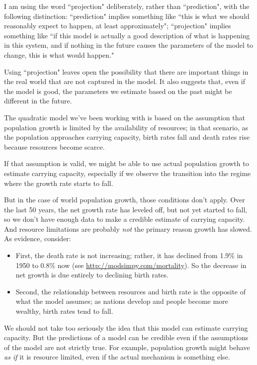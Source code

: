 \documentclass[12pt]{book}
\theoremstyle{exercise}
\begin{document}
I am using the word ``projection" deliberately, rather than ``prediction", with the following distinction: ``prediction" implies something like ``this is what we should reasonably expect to happen, at least approximately"; ``projection" implies something like ``if this model is actually a good description of what is happening in this system, and if nothing in the future causes the parameters of the model to change, this is what would happen."

Using ``projection" leaves open the possibility that there are important things in the real world that are not captured in the model.  It also suggests that, even if the model is good, the parameters we estimate based on the past might be different in the future.

The quadratic model we've been working with is based on the assumption that population growth is limited by the availability of resources; in that scenario, as the population approaches carrying capacity, birth rates fall and death rates rise because resources become scarce.

If that assumption is valid, we might be able to use actual population growth to estimate carrying capacity, especially if we observe the transition into the regime where the growth rate starts to fall.

But in the case of world population growth, those conditions don't apply.  Over the last 50 years, the net growth rate has leveled off, but not yet started to fall, so we don't have enough data to make a credible estimate of carrying capacity.  And resource limitations are probably {\em not} the primary reason growth has slowed.  As evidence, consider:

\begin{itemize}

\item First, the death rate is not increasing; rather, it has declined from 1.9\% in 1950 to 0.8\% now (see \url{http://modsimpy.com/mortality}).  So the decrease in net growth is due entirely to declining birth rates.

\item Second, the relationship between resources and birth rate is the opposite of what the model assumes; as nations develop and people become more wealthy, birth rates tend to fall.  

\end{itemize} 

We should not take too seriously the idea that this model can estimate carrying capacity.  But the predictions of a model can be credible even if the assumptions of the model are not strictly true.  For example, population growth might behave {\em as if} it is resource limited, even if the actual mechanism is something else.
\end{document}
